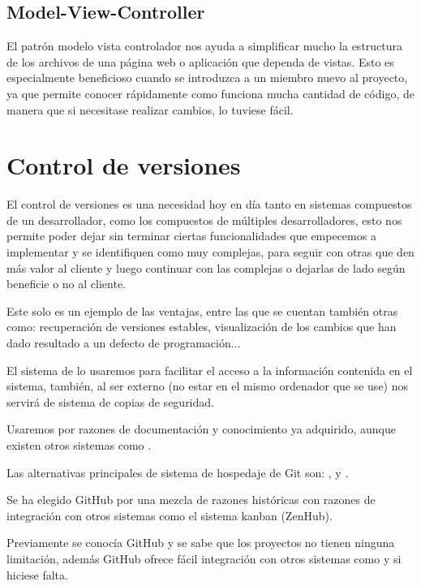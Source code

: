 \subsection{Model-View-Controller}

El patrón modelo vista controlador nos ayuda a simplificar mucho la estructura de los archivos de una página web o aplicación que dependa de vistas. Esto es especialmente beneficioso cuando se introduzca a un miembro nuevo al proyecto, ya que permite conocer rápidamente como funciona mucha cantidad de código, de manera que si necesitase realizar cambios, lo tuviese fácil.


\section{Control de versiones}

El control de versiones es una necesidad hoy en día tanto en sistemas compuestos de un desarrollador, como los compuestos de múltiples desarrolladores, esto nos permite poder dejar sin terminar ciertas funcionalidades que empecemos a implementar y se identifiquen como muy complejas, para seguir con otras que den más valor al cliente y luego continuar con las complejas o dejarlas de lado según beneficie o no al cliente.

Este solo es un ejemplo de las ventajas, entre las que se cuentan también otras como: recuperación de versiones estables, visualización de los cambios que han dado resultado a un defecto de programación...

El sistema de  lo usaremos para facilitar el acceso a la información contenida en el sistema, también, al ser externo (no estar en el mismo ordenador que se use) nos servirá de sistema de copias de seguridad.

Usaremos  por razones de documentación y conocimiento ya adquirido, aunque existen otros sistemas como .

Las alternativas principales de sistema de hospedaje de Git son: ,  y .

Se ha elegido GitHub por una mezcla de razones históricas con razones de integración con otros sistemas como el sistema kanban (ZenHub).

Previamente se conocía GitHub y se sabe que los proyectos  no tienen ninguna limitación, además GitHub ofrece fácil integración con otros sistemas como  y  si hiciese falta.



